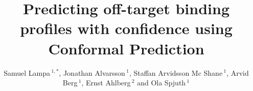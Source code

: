 \documentclass[utf8]{frontiersSCNS} %
\def\firstAuthorLast{Lampa {et~al.}} %
\def\Authors{Samuel Lampa\,$^{1,*}$, Jonathan Alvarsson\,$^{1}$, Staffan Arvidsson Mc Shane\,$^{1}$, Arvid Berg\,$^{1}$, Ernst Ahlberg\,$^{2}$  and Ola Spjuth\,$^{1}$}
\begin{document}
\onecolumn
{}

\title[Predicting off-target binding profiles with confidence using Conformal
Prediction]{Predicting off-target binding profiles with confidence using Conformal
Prediction}

\author[\firstAuthorLast ]{\Authors} %
\address{} %
\correspondance{} %

\extraAuth{}%


\maketitle
\end{document}

